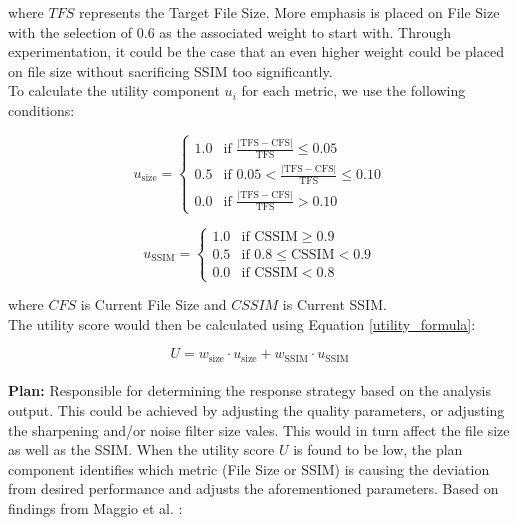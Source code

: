 \documentclass[conference]{IEEEtran}
\begin{document}
where $TFS$ represents the Target File Size. More emphasis is placed on File Size with the selection of 0.6 as the associated weight to start with. Through experimentation, it could be the case that an even higher weight could be placed on file size without sacrificing SSIM too significantly.\\

To calculate the utility component \( u_i \) for each metric, we use the following conditions:

\begin{equation}
	u_{\text{size}} =
	\begin{cases}
		1.0 & \text{if } \frac{|\text{TFS} - \text{CFS}|}{\text{TFS}} \leq 0.05        \\
		0.5 & \text{if } 0.05 < \frac{|\text{TFS} - \text{CFS}|}{\text{TFS}} \leq 0.10 \\
		0.0 & \text{if } \frac{|\text{TFS} - \text{CFS}|}{\text{TFS}} > 0.10
	\end{cases}
	\label{size_utility}
\end{equation}

\begin{equation}
	u_{\text{SSIM}} =
	\begin{cases}
		1.0 & \text{if CSSIM} \geq 0.9               \\
		0.5 & \text{if } 0.8 \leq \text{CSSIM} < 0.9 \\
		0.0 & \text{if CSSIM} < 0.8
	\end{cases}
	\label{SSIM_utility}
\end{equation}

where $CFS$ is Current File Size and $CSSIM$ is Current SSIM.\\

\noindent The utility score would then be calculated using Equation \ref{utility_formula}:

\begin{equation}
	U = w_{\text{size}} \cdot u_{\text{size}} + w_{\text{SSIM}} \cdot u_{\text{SSIM}}
	\label{utility_formula}
\end{equation}\\

\noindent \textbf{Plan:} Responsible for determining the response strategy based on the analysis output. This could be achieved by adjusting the quality parameters, or adjusting the sharpening and/or noise filter size vales. This would in turn affect the file size as well as the SSIM. When the utility score $U$ is found to be low, the plan component identifies which metric (File Size or SSIM) is causing the deviation from desired performance and adjusts the aforementioned parameters. Based on findings from Maggio et al. \cite{SAVE_pdf}:\\
\end{document}
